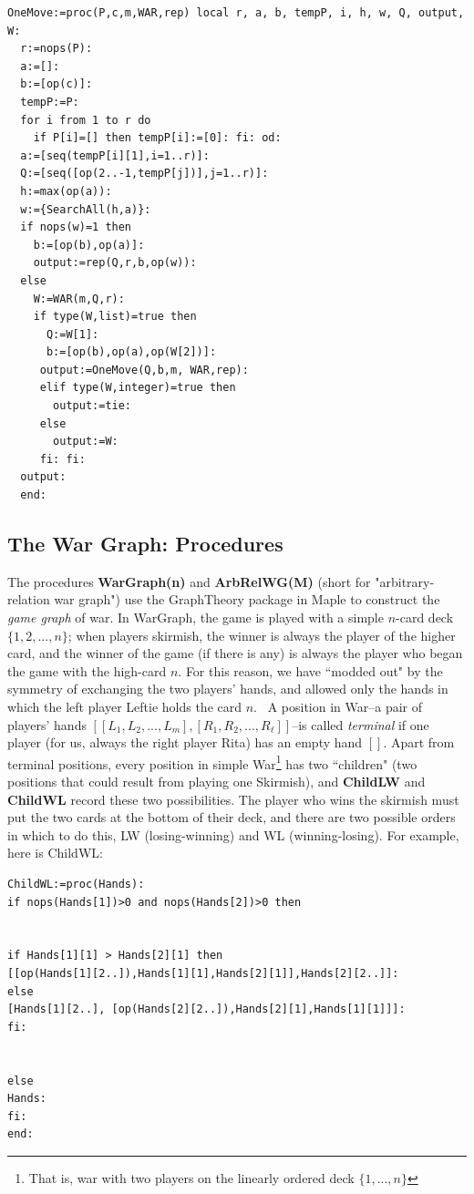 \documentclass[12pt]{amsart}
\begin{document}
\begin{lstlisting}
OneMove:=proc(P,c,m,WAR,rep) local r, a, b, tempP, i, h, w, Q, output, W:
  r:=nops(P):
  a:=[]:
  b:=[op(c)]:
  tempP:=P:
  for i from 1 to r do
    if P[i]=[] then tempP[i]:=[0]: fi: od:
  a:=[seq(tempP[i][1],i=1..r)]:
  Q:=[seq([op(2..-1,tempP[j])],j=1..r)]:
  h:=max(op(a)):
  w:={SearchAll(h,a)}:
  if nops(w)=1 then
    b:=[op(b),op(a)]:
    output:=rep(Q,r,b,op(w)): 
  else
    W:=WAR(m,Q,r):
    if type(W,list)=true then
      Q:=W[1]:
      b:=[op(b),op(a),op(W[2])]: 
     output:=OneMove(Q,b,m, WAR,rep):
     elif type(W,integer)=true then
       output:=tie:
     else
       output:=W:
     fi: fi:
  output:
  end:
\end{lstlisting}


\subsection{The War Graph: Procedures}
The procedures \textbf{WarGraph(n)} and \textbf{ArbRelWG(M)} (short for "arbitrary-relation war graph")
use the GraphTheory package in Maple to construct the \emph{game graph} of war.
In WarGraph, the game is played with a simple $n$-card deck $\{1,2,...,n\}$; when players skirmish,
the winner is always the player of the higher card, and the winner of the game (if there is any) is always the player who began the game with the high-card $n$. For this reason, we have ``modded out" by the symmetry
of exchanging the two players' hands, and allowed only the hands in which the left player Leftie holds the card $n$. 
A position in War--a pair of players' hands $[[L_1, L_2,...,L_m],[R_1,R_2,...,R_\ell]]$--is called \emph{terminal}
if one player (for us, always the right player Rita) has an empty hand $[]$. Apart from terminal positions,
every position in simple War\footnote{That is, war with two players on the linearly ordered deck $\{1,...,n\}$} has two ``children" (two positions that could result from playing one Skirmish), and \textbf{ChildLW} and \textbf{ChildWL} record these two possibilities. The player who wins the skirmish must put the two cards at the bottom of their deck, and there are two possible orders in which to do this, LW (losing-winning) and WL (winning-losing). For example, here is ChildWL:
\begin{lstlisting}
ChildWL:=proc(Hands):
if nops(Hands[1])>0 and nops(Hands[2])>0 then


if Hands[1][1] > Hands[2][1] then
[[op(Hands[1][2..]),Hands[1][1],Hands[2][1]],Hands[2][2..]]:
else
[Hands[1][2..], [op(Hands[2][2..]),Hands[2][1],Hands[1][1]]]:
fi:


else
Hands:
fi:
end:
\end{lstlisting}
\end{document}
